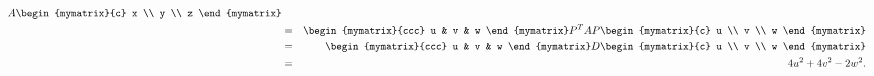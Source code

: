 \begin{solution}
\begin{eqnarray*}
    A
    \begin{mymatrix}{c} x \\ y \\ z \end{mymatrix} \\
    &=&
    \begin{mymatrix}{ccc} u & v & w \end{mymatrix}
    P^TAP
    \begin{mymatrix}{c} u \\ v \\ w \end{mymatrix} \\
    &=&
    \begin{mymatrix}{ccc} u & v & w \end{mymatrix}
    D
    \begin{mymatrix}{c} u \\ v \\ w \end{mymatrix} \\
    &=&
    4u^2 + 4v^2 - 2w^2.
  \end{eqnarray*}
\end{solution}

